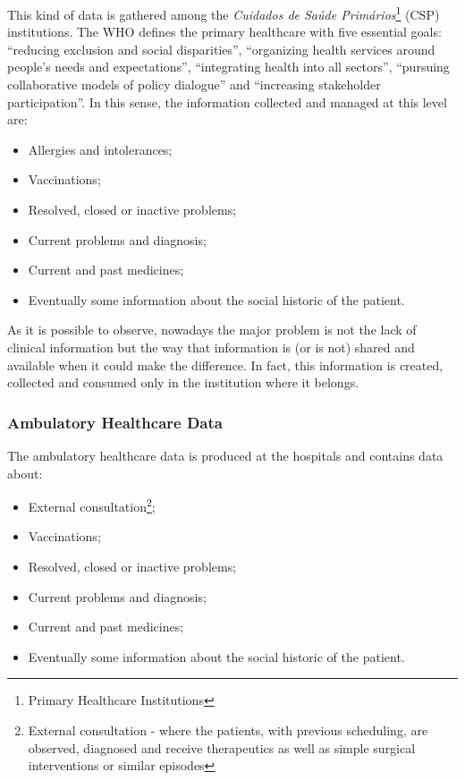 This kind of data is gathered among the \textit{Cuidados de Saúde Primários}\footnote{Primary Healthcare Institutions} (CSP) institutions. The WHO defines the primary healthcare with five essential goals: ``reducing exclusion and social disparities'', ``organizing health services around people's needs and expectations'', ``integrating health into all sectors'', ``pursuing collaborative models of policy dialogue'' and ``increasing stakeholder participation''. In this sense, the information collected and managed at this level are:
\begin{itemize}
\item Allergies and intolerances;
\item Vaccinations;
\item Resolved, closed or inactive problems;
\item Current problems and diagnosis;
\item Current and past medicines;
\item Eventually some information about the social historic of the patient.
\end{itemize}

As it is possible to observe, nowadays the major problem is not the lack of clinical information but the way that information is (or is not) shared and available when it could make the difference. In fact, this information is created, collected and consumed only in the institution where it belongs.


\subsubsection{Ambulatory Healthcare Data} \label{sec:hosp_data}

The ambulatory healthcare data is produced at the hospitals and contains data about:
\begin{itemize}
\item External consultation\footnote{External consultation - where the patients, with previous scheduling, are observed, diagnosed and receive therapeutics as well as simple surgical interventions or similar episodes};
\item Vaccinations;
\item Resolved, closed or inactive problems;
\item Current problems and diagnosis;
\item Current and past medicines;
\item Eventually some information about the social historic of the patient.
\end{itemize}

